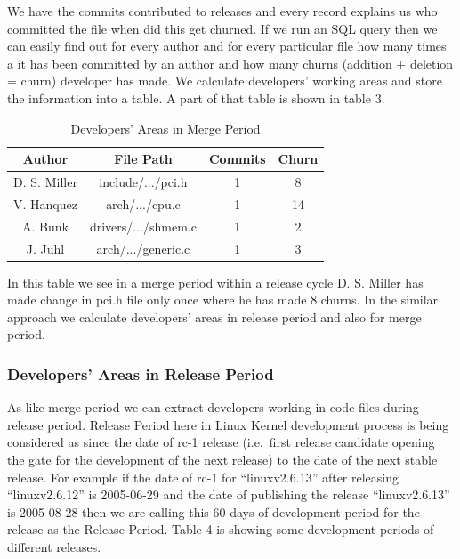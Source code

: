 \documentclass{acm_proc_article-sp}
\begin{document}
We have the commits contributed to releases and every record explains us who committed the file when did this get churned. If we run an SQL query then we can easily find out for every author and for every particular file how many times a it has been committed by an author and how many churns (addition + deletion = churn) developer has made. We calculate developers' working areas and store the information into a table. A part of that table is shown in table 3.

\begin{table}[ht]
\caption{Developers' Areas in Merge Period}  %
\centering 						%
\begin{tabular}{c c c c}				%
\hline\hline						%
Author		& File Path			& Commits		& Churn \\ [0.5ex]
\hline 							%
D. S. Miller	& include/.../pci.h		& 1				& 8 \\
V. Hanquez	& arch/.../cpu.c		& 1				& 14 \\
A. Bunk		& drivers/.../shmem.c	& 1				& 2 \\
J. Juhl		& arch/.../generic.c		& 1				& 3 \\
[1ex]							%
\hline 							%
\end{tabular}
\label{table:nonlin} 				%
\end{table}

In this table we see in a merge period within a release cycle D. S. Miller has made change in pci.h file only once where he has made 8 churns. In the similar approach we calculate developers' areas in release period and also for merge period.

\subsubsection{Developers' Areas in Release Period}
As like merge period we can extract developers working in code files during release period. Release Period here in Linux Kernel development process is being considered as since the date of rc-1 release (i.e.\ first release candidate opening the gate for the development of the next release) to the date of the next stable release. For example if the date of rc-1 for ``linuxv2.6.13'' after releasing ``linuxv2.6.12'' is 2005-06-29 and the date of publishing the release ``linuxv2.6.13'' is 2005-08-28 then we are calling this 60 days of development period for the release as the Release Period. Table 4 is showing some development periods of different releases.
\end{document}
